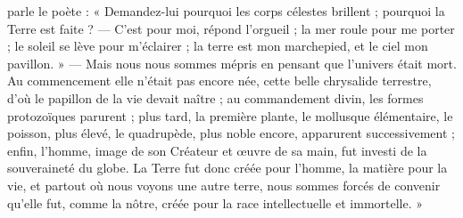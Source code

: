 \documentclass[a4paper, 11pt, oneside]{article}
\begin{document}
parle le poète : « Demandez-lui pourquoi les corps célestes brillent ; pourquoi la Terre est faite ? --- C'est pour moi, répond l'orgueil ; la mer roule pour me porter ; le soleil se lève pour m'éclairer ; la terre est mon marchepied, et le ciel mon pavillon. » --- Mais nous nous sommes mépris en pensant que l'univers était mort. Au commencement elle n'était pas encore née, cette belle chrysalide terrestre, d'où le papillon de la vie devait naître ; au commandement divin, les formes protozoïques parurent ; plus tard, la première plante, le mollusque élémentaire, le poisson, plus élevé, le quadrupède, plus noble encore, apparurent successivement ; enfin, l'homme, image de son Créateur et œuvre de sa main, fut investi de la souveraineté du globe. La Terre fut donc créée pour l'homme, la matière pour la vie, et partout où nous voyons une autre terre, nous sommes forcés de convenir qu'elle fut, comme la nôtre, créée pour la race intellectuelle et immortelle. »
\end{document}

